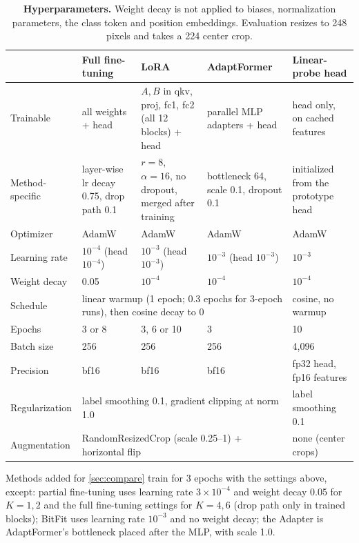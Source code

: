 \begin{table}[h]
  \centering
  \scriptsize
  \renewcommand{\arraystretch}{1.05}
  \begin{tabular}{@{}p{2.2cm}p{3.5cm}p{3.5cm}p{3.5cm}p{3.0cm}@{}}
    \toprule
    & Full fine-tuning & LoRA & AdaptFormer & Linear-probe head \\
    \midrule
    Trainable & all weights + head & $A, B$ in qkv, proj, fc1, fc2 (all 12 blocks) + head & parallel MLP adapters + head & head only, on cached features \\
    Method-specific & layer-wise lr decay 0.75, drop path 0.1 & $r=8$, $\alpha=16$, no dropout, merged after training & bottleneck 64, scale 0.1, dropout 0.1 & initialized from the prototype head \\
    Optimizer & AdamW & AdamW & AdamW & AdamW \\
    Learning rate & $10^{-4}$ (head $10^{-4}$) & $10^{-3}$ (head $10^{-3}$) & $10^{-3}$ (head $10^{-3}$) & $10^{-3}$ \\
    Weight decay & 0.05 & $10^{-4}$ & $10^{-4}$ & $10^{-4}$ \\
    Schedule & \multicolumn{3}{p{11.3cm}}{linear warmup (1 epoch; 0.3 epochs for 3-epoch runs), then cosine decay to 0} & cosine, no warmup \\
    Epochs & 3 or 8 & 3, 6 or 10 & 3 & 10 \\
    Batch size & 256 & 256 & 256 & 4,096 \\
    Precision & bf16 & bf16 & bf16 & fp32 head, fp16 features \\
    Regularization & \multicolumn{3}{p{11.3cm}}{label smoothing 0.1, gradient clipping at norm 1.0} & label smoothing 0.1 \\
    Augmentation & \multicolumn{3}{p{11.3cm}}{RandomResizedCrop (scale 0.25--1) + horizontal flip} & none (center crops) \\
    \bottomrule
  \end{tabular}
  \caption{\textbf{Hyperparameters.} Weight decay is not applied to biases, normalization parameters, the class token and position embeddings. Evaluation resizes to 248 pixels and takes a 224 center crop.}
  \label{tab:hparams}
\end{table}

Methods added for \cref{sec:compare} train for 3 epochs with the settings above, except: partial fine-tuning uses learning rate $3{\times}10^{-4}$ and weight decay 0.05 for $K = 1, 2$ and the full fine-tuning settings for $K = 4, 6$ (drop path only in trained blocks); BitFit uses learning rate $10^{-3}$ and no weight decay; the Adapter is AdaptFormer's bottleneck placed after the MLP, with scale 1.0.
